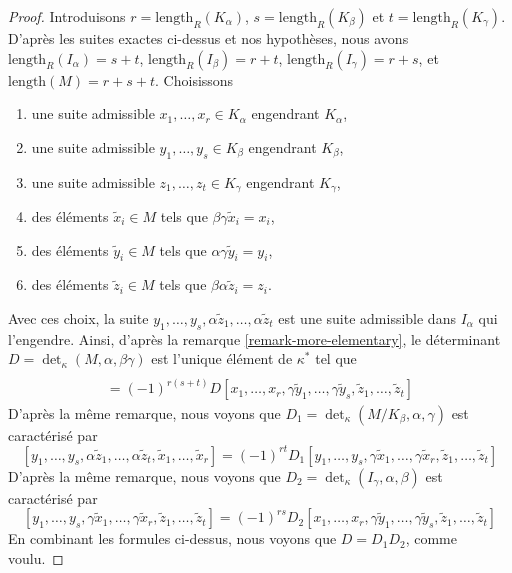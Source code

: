 \begin{proof}
\medskip\noindent
Introduisons $r = \text{length}_R(K_\alpha)$,
$s = \text{length}_R(K_\beta)$ et $t = \text{length}_R(K_\gamma)$.
D'après les suites exactes ci-dessus et nos hypothèses, nous avons
$\text{length}_R(I_\alpha) = s + t$, $\text{length}_R(I_\beta) = r + t$,
$\text{length}_R(I_\gamma) = r + s$, et
$\text{length}(M) = r + s + t$.
Choisissons
\begin{enumerate}
\item une suite admissible $x_1, \ldots, x_r \in K_\alpha$
engendrant $K_\alpha$,
\item une suite admissible $y_1, \ldots, y_s \in K_\beta$
engendrant $K_\beta$,
\item une suite admissible $z_1, \ldots, z_t \in K_\gamma$
engendrant $K_\gamma$,
\item des éléments $\tilde x_i \in M$ tels que $\beta\gamma\tilde x_i = x_i$,
\item des éléments $\tilde y_i \in M$ tels que $\alpha\gamma\tilde y_i = y_i$,
\item des éléments $\tilde z_i \in M$ tels que $\beta\alpha\tilde z_i = z_i$.
\end{enumerate}
Avec ces choix, la suite
$y_1, \ldots, y_s, \alpha\tilde z_1, \ldots, \alpha\tilde z_t$
est une suite admissible dans $I_\alpha$ qui l'engendre.
Ainsi, d'après la remarque \ref{remark-more-elementary}, le déterminant
$D = \det_\kappa(M, \alpha, \beta\gamma)$ est
l'unique élément de $\kappa^*$ tel que
\begin{align*}
[y_1, \ldots, y_s,
\alpha\tilde z_1, \ldots, \alpha\tilde z_s,
\tilde x_1, \ldots, \tilde x_r] \\
= (-1)^{r(s + t)} D
[x_1, \ldots, x_r,
\gamma\tilde y_1, \ldots, \gamma\tilde y_s,
\tilde z_1, \ldots, \tilde z_t]
\end{align*}
D'après la même remarque, nous voyons que
$D_1 = \det_\kappa(M/K_\beta, \alpha, \gamma)$
est caractérisé par
$$
[y_1, \ldots, y_s,
\alpha\tilde z_1, \ldots, \alpha\tilde z_t,
\tilde x_1, \ldots, \tilde x_r]
=
(-1)^{rt} D_1
[y_1, \ldots, y_s,
\gamma\tilde x_1, \ldots, \gamma\tilde x_r,
\tilde z_1, \ldots, \tilde z_t]
$$
D'après la même remarque, nous voyons que
$D_2 = \det_\kappa(I_\gamma, \alpha, \beta)$ est caractérisé par
$$
[y_1, \ldots, y_s,
\gamma\tilde x_1, \ldots, \gamma\tilde x_r,
\tilde z_1, \ldots, \tilde z_t]
=
(-1)^{rs} D_2
[x_1, \ldots, x_r,
\gamma\tilde y_1, \ldots, \gamma\tilde y_s,
\tilde z_1, \ldots, \tilde z_t]
$$
En combinant les formules ci-dessus, nous voyons que $D = D_1 D_2$,
comme voulu.
\end{proof}


